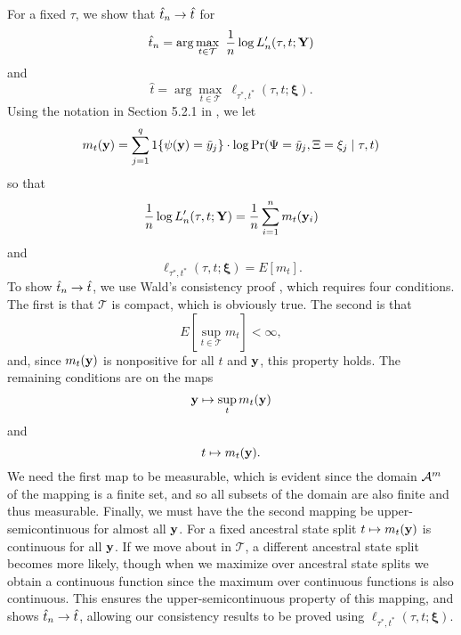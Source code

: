 For a fixed $\tau$, we show that $\hat{t}_n \rightarrow \hat{t}$ for
\[
\hat{t}_n = \arg\max_{t\in\mathcal{T}} \ \frac{1}{n}\log L_n'(\tau, t; \mathbf{Y})
\]
and
\[
\hat{t} = \arg\max_{t\in\mathcal{T}} \ \ell_{\tau^*,t^*}(\tau, t; \boldsymbol\xi).
\]
Using the notation in Section 5.2.1 in \citet{van1998asymptotic}, we let
\[
m_t(\mathbf{y}) = \sum_{j=1}^q 1\{\psi(\mathbf{y})=\tilde{y}_j\} \cdot \log \Pr(\Psi=\tilde{y}_j, \Xi=\xi_j \mid \tau, t)
\]
so that
\[
\frac{1}{n}\log L_n'(\tau, t; \mathbf{Y}) = \frac{1}{n} \sum_{i=1}^n m_t(\mathbf{y}_i)
\]
and
\[
\ell_{\tau^*,t^*}(\tau, t; \boldsymbol\xi) = E[m_t].
\]
To show $\hat{t}_n \rightarrow \hat{t}$, we use Wald's consistency proof \citep[p. 48, Theorem 5.14 of ][]{van1998asymptotic}, which requires four conditions.
The first is that $\mathcal{T}$ is compact, which is obviously true.
The second is that
\[
E\left[\sup_{t\in\mathcal{T}} m_t\right] < \infty,
\]
and, since $m_t(\mathbf{y})$ is nonpositive for all $t$ and $\mathbf{y}$, this property holds.
The remaining conditions are on the maps
\[
\mathbf{y} \mapsto \sup_t m_t(\mathbf{y})
\]
and
\[
t \mapsto m_t(\mathbf{y}).
\]
We need the first map to be measurable, which is evident since the domain $\mathcal{A}^m$ of the mapping is a finite set, and so all subsets of the domain are also finite and thus measurable.
Finally, we must have the the second mapping be upper-semicontinuous for almost all $\mathbf{y}$.
For a fixed ancestral state split $t \mapsto m_t(\mathbf{y})$ is continuous for all $\mathbf{y}$.
If we move about in $\mathcal{T}$, a different ancestral state split becomes more likely, though when we maximize over ancestral state splits we obtain a continuous function since the maximum over continuous functions is also continuous.
This ensures the upper-semicontinuous property of this mapping, and shows $\hat{t}_n \rightarrow \hat{t}$, allowing our consistency results to be proved using $\ell_{\tau^*,t^*}(\tau, t; \boldsymbol\xi)$.

